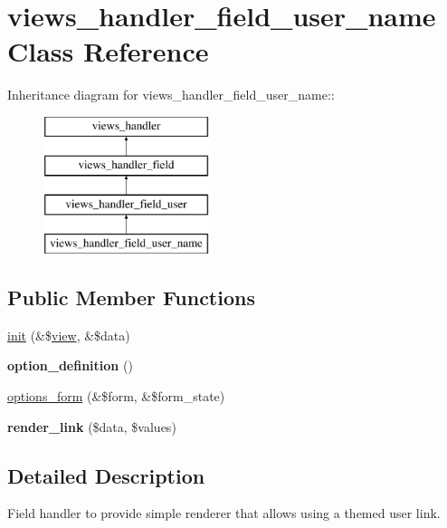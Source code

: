 \hypertarget{classviews__handler__field__user__name}{
\section{views\_\-handler\_\-field\_\-user\_\-name Class Reference}
\label{classviews__handler__field__user__name}
}
Inheritance diagram for views\_\-handler\_\-field\_\-user\_\-name::\begin{figure}[H]
\begin{center}
\leavevmode
\includegraphics[height=4cm]{classviews__handler__field__user__name}
\end{center}
\end{figure}
\subsection*{Public Member Functions}
\begin{DoxyCompactItemize}
\item 
\hyperlink{classviews__handler__field__user__name_a5879bbaa4a1e59f9509b9a5d6fbdd9b2}{init} (\&\$\hyperlink{classview}{view}, \&\$data)
\item 
\hypertarget{classviews__handler__field__user__name_a11092f8f1854e14f245b644a2fed8434}{
{\bfseries option\_\-definition} ()}
\label{classviews__handler__field__user__name_a11092f8f1854e14f245b644a2fed8434}

\item 
\hyperlink{classviews__handler__field__user__name_a0c3b7db3d060e384287fa62f348c9387}{options\_\-form} (\&\$form, \&\$form\_\-state)
\item 
\hypertarget{classviews__handler__field__user__name_abb46f4d178fa916dde1592eb00b1996b}{
{\bfseries render\_\-link} (\$data, \$values)}
\label{classviews__handler__field__user__name_abb46f4d178fa916dde1592eb00b1996b}

\end{DoxyCompactItemize}


\subsection{Detailed Description}
Field handler to provide simple renderer that allows using a themed user link. 


